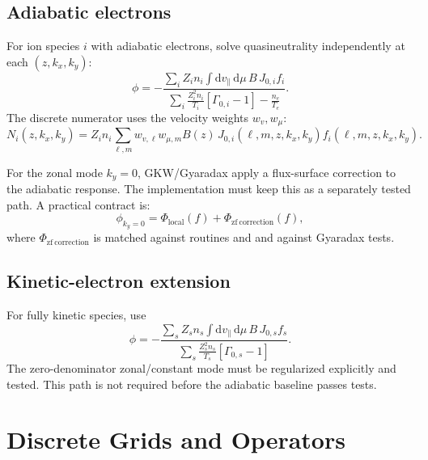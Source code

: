 \documentclass[11pt,a4paper]{article}
\newcommand{\dd}{\mathrm{d}}
\newcommand{\vpar}{v_{\parallel}}
\begin{document}
\subsection{Adiabatic electrons}

For ion species \(i\) with adiabatic electrons, solve quasineutrality independently at each \((z,k_x,k_y)\):
\begin{equation}
  \phi
  =
  -
  \frac{
    \displaystyle
    \sum_i
    Z_i n_i
    \int \dd\vpar\,\dd\mu\,
    B\,J_{0,i} f_i
  }{
    \displaystyle
    \sum_i
    \frac{Z_i^2 n_i}{T_i}
    \left[\Gamma_{0,i}-1\right]
    -
    \frac{n_e}{T_e}
  }.
  \label{eq:phi-adiabatic}
\end{equation}
The discrete numerator uses the velocity weights \(w_v,w_\mu\):
\begin{equation}
  N_i(z,k_x,k_y)
  =
  Z_i n_i
  \sum_{\ell,m}
  w_{v,\ell} w_{\mu,m}
  B(z)\,
  J_{0,i}(\ell,m,z,k_x,k_y)
  f_i(\ell,m,z,k_x,k_y).
  \label{eq:phi-numerator-discrete}
\end{equation}

For the zonal mode \(k_y=0\), GKW/Gyaradax apply a flux-surface correction to the adiabatic response.  The implementation must keep this as a separately tested path.  A practical contract is:
\begin{equation}
  \phi_{k_y=0}
  =
  \Phi_{\mathrm{local}}(f)
  +
  \Phi_{\mathrm{zf\ correction}}(f),
  \label{eq:zonal-correction-contract}
\end{equation}
where \(\Phi_{\mathrm{zf\ correction}}\) is matched against  routines  and  and against Gyaradax tests.

\subsection{Kinetic-electron extension}

For fully kinetic species, use
\begin{equation}
  \phi
  =
  -
  \frac{
    \displaystyle
    \sum_s
    Z_s n_s
    \int \dd\vpar\,\dd\mu\,
    B\,J_{0,s} f_s
  }{
    \displaystyle
    \sum_s
    \frac{Z_s^2 n_s}{T_s}
    \left[\Gamma_{0,s}-1\right]
  }.
  \label{eq:phi-kinetic}
\end{equation}
The zero-denominator zonal/constant mode must be regularized explicitly and tested.  This path is not required before the adiabatic baseline passes tests.

\section{Discrete Grids and Operators}
\end{document}
